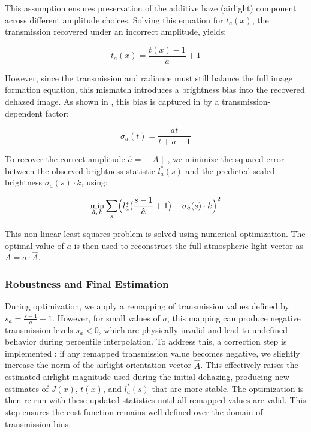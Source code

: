 \documentclass[conference]{IEEEtran}
\begin{document}
This assumption ensures preservation of the additive haze (airlight) component across different amplitude choices. Solving this equation for \( t_a(x) \), the transmission recovered under an incorrect amplitude, yields:

\begin{equation}
\label{recovered_transmission }
t_a(x) = \frac{t(x) - 1}{a} + 1
\end{equation}

However, since the transmission and radiance must still balance the full image formation equation, this mismatch introduces a brightness bias into the recovered dehazed image. As shown in \cite{airlight}, this bias is captured in by a transmission-dependent factor:

\begin{equation}
\label{brightness_bias}
\sigma_a(t) = \frac{a t}{t + a - 1}
\end{equation}

To recover the correct amplitude \( \hat{a} = \|A\| \), we minimize the squared error between the observed brightness statistic \( l^*_a(s) \) and the predicted scaled brightness \( \sigma_a(s) \cdot k \), using:

\begin{equation}
    \label{optimisation}
    \min_{\hat{a},\, k} \sum_s \Bigl( l^*_{\hat{a}}\bigl( \frac{s - 1}{\hat{a}} + 1 \bigr) - \sigma_{\hat{a}}(s) \cdot k \Bigr)^2
\end{equation}

This non-linear least-squares problem is solved using numerical optimization. The optimal value of \( a \) is then used to reconstruct the full atmospheric light vector as \( A = a \cdot \hat{A} \).


\subsubsection{Robustness and Final Estimation}


During optimization, we apply a remapping of transmission values defined by \( s_a = \frac{s - 1}{a} + 1 \). However, for small values of \( a \), this mapping can produce negative transmission levels \( s_a < 0 \), which are physically invalid and lead to undefined behavior during percentile interpolation. To address this, a correction step is implemented \cite{airlight}: if any remapped transmission value becomes negative, we slightly increase the norm of the airlight orientation vector \( \hat{A} \). This effectively raises the estimated airlight magnitude used during the initial dehazing, producing new estimates of \( J(x) \), \( t(x) \), and \( l^*_a(s) \) that are more stable. The optimization is then re-run with these updated statistics until all remapped values are valid. This step ensures the cost function remains well-defined over the domain of transmission bins.
\end{document}
